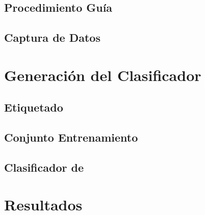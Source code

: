 \subsection{Procedimiento Guía }

\subsection{Captura de Datos}

\section{Generación del Clasificador }

\label{sec6:clasificacion}

\subsection{Etiquetado}

\subsection{Conjunto Entrenamiento }

\subsection{Clasificador de }

\section{Resultados }

\label{sec6:resultados}
